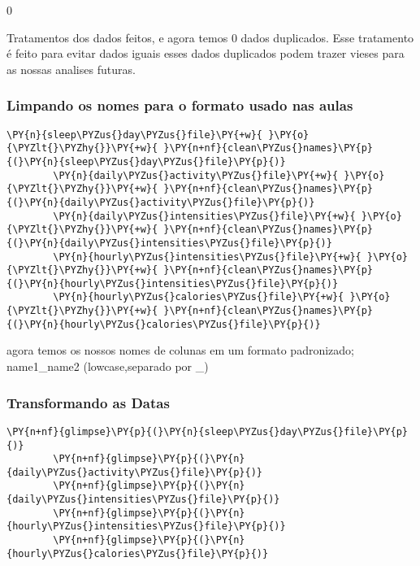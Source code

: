 0


Tratamentos dos dados feitos, e agora temos 0 dados duplicados. Esse
tratamento é feito para evitar dados iguais esses dados duplicados podem
trazer vieses para as nossas analises futuras.

\subsubsection{Limpando os nomes para o formato usado nas aulas}

\begin{tcolorbox}[breakable, size=fbox, boxrule=1pt, pad at break*=1mm,colback=cellbackground, colframe=cellborder]
    \begin{Verbatim}[commandchars=\\\{\}]
        \PY{n}{sleep\PYZus{}day\PYZus{}file}\PY{+w}{ }\PY{o}{\PYZlt{}\PYZhy{}}\PY{+w}{ }\PY{n+nf}{clean\PYZus{}names}\PY{p}{(}\PY{n}{sleep\PYZus{}day\PYZus{}file}\PY{p}{)}
        \PY{n}{daily\PYZus{}activity\PYZus{}file}\PY{+w}{ }\PY{o}{\PYZlt{}\PYZhy{}}\PY{+w}{ }\PY{n+nf}{clean\PYZus{}names}\PY{p}{(}\PY{n}{daily\PYZus{}activity\PYZus{}file}\PY{p}{)}
        \PY{n}{daily\PYZus{}intensities\PYZus{}file}\PY{+w}{ }\PY{o}{\PYZlt{}\PYZhy{}}\PY{+w}{ }\PY{n+nf}{clean\PYZus{}names}\PY{p}{(}\PY{n}{daily\PYZus{}intensities\PYZus{}file}\PY{p}{)}
        \PY{n}{hourly\PYZus{}intensities\PYZus{}file}\PY{+w}{ }\PY{o}{\PYZlt{}\PYZhy{}}\PY{+w}{ }\PY{n+nf}{clean\PYZus{}names}\PY{p}{(}\PY{n}{hourly\PYZus{}intensities\PYZus{}file}\PY{p}{)}
        \PY{n}{hourly\PYZus{}calories\PYZus{}file}\PY{+w}{ }\PY{o}{\PYZlt{}\PYZhy{}}\PY{+w}{ }\PY{n+nf}{clean\PYZus{}names}\PY{p}{(}\PY{n}{hourly\PYZus{}calories\PYZus{}file}\PY{p}{)}
    \end{Verbatim}
\end{tcolorbox}

agora temos os nossos nomes de colunas em um formato padronizado;
name1\_name2 (lowcase,separado por \_)

\subsubsection{Transformando as Datas}

\begin{tcolorbox}[breakable, size=fbox, boxrule=1pt, pad at break*=1mm,colback=cellbackground, colframe=cellborder]
    \begin{Verbatim}[commandchars=\\\{\}]
        \PY{n+nf}{glimpse}\PY{p}{(}\PY{n}{sleep\PYZus{}day\PYZus{}file}\PY{p}{)}
        \PY{n+nf}{glimpse}\PY{p}{(}\PY{n}{daily\PYZus{}activity\PYZus{}file}\PY{p}{)}
        \PY{n+nf}{glimpse}\PY{p}{(}\PY{n}{daily\PYZus{}intensities\PYZus{}file}\PY{p}{)}
        \PY{n+nf}{glimpse}\PY{p}{(}\PY{n}{hourly\PYZus{}intensities\PYZus{}file}\PY{p}{)}
        \PY{n+nf}{glimpse}\PY{p}{(}\PY{n}{hourly\PYZus{}calories\PYZus{}file}\PY{p}{)}
    \end{Verbatim}
\end{tcolorbox}

